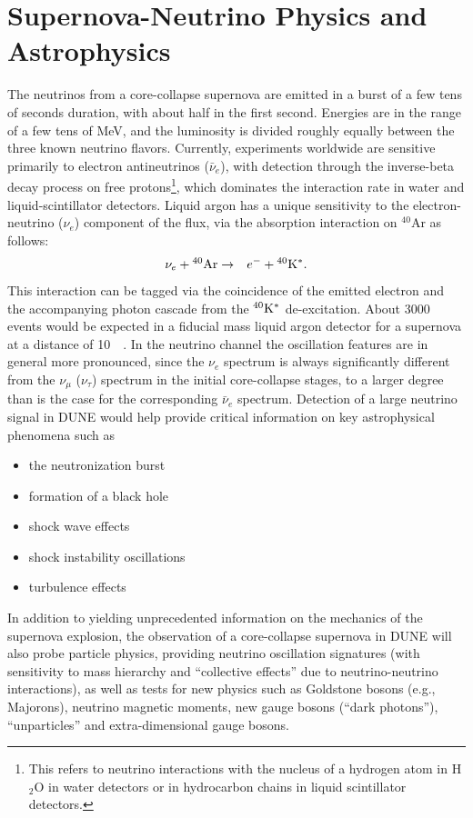 \section{Supernova-Neutrino Physics and Astrophysics}

The neutrinos from a core-collapse supernova are emitted in a burst of
a few tens of seconds duration, with about half in the first
second. Energies are in the range of a few tens of MeV, and the
luminosity is divided roughly equally between the three known neutrino
flavors.  Currently, experiments worldwide are sensitive primarily to
electron antineutrinos ($\bar{\nu}_e$), with detection through the inverse-beta decay
process on free protons\footnote{This refers to neutrino interactions with the nucleus of a
hydrogen atom in H$_2$O in water detectors or in hydrocarbon chains in 
liquid scintillator detectors.},
 which dominates the interaction rate in water
and liquid-scintillator detectors.  Liquid argon has a unique sensitivity to
the electron-neutrino ($\nu_e$) component of the flux, via the absorption
interaction on $^{40}$Ar as follows:
\begin{eqnarray*}
\nu_e +{}^{40}{\rm Ar} & \rightarrow & e^-+{}^{40}{\rm K^*}.
\end{eqnarray*} 
This interaction can be tagged via the coincidence of the emitted
electron and the accompanying photon cascade from the $^{40}{\rm K^*}$
de-excitation.  About \num{3000} events would be expected in a 
fiducial mass liquid argon detector for a supernova at a distance of
\SI{10}{\kilo\parsec}.  In the neutrino channel the oscillation
features are in general more pronounced, since the $\nu_e$ spectrum is
always significantly different from the $\nu_\mu$ ($\nu_\tau$) spectrum 
in the initial core-collapse stages, to a larger degree than is the
case for the corresponding $\bar{\nu}_e$ spectrum.  Detection of a large
neutrino signal in DUNE would help provide critical information on key
astrophysical phenomena such as
\begin{itemize}
\item the neutronization burst
\item formation of a black hole
\item shock wave effects
\item shock instability oscillations
\item turbulence effects
\end{itemize}

In addition to yielding unprecedented information on the mechanics of
the supernova explosion, the observation of a core-collapse supernova in
DUNE will also probe particle physics, 
providing neutrino oscillation signatures (with sensitivity to mass hierarchy and ``collective effects'' due to neutrino-neutrino interactions), as well as tests for new physics such as Goldstone bosons (e.g., Majorons), neutrino magnetic
moments, new gauge bosons (``dark photons''), ``unparticles'' and
extra-dimensional gauge bosons.

